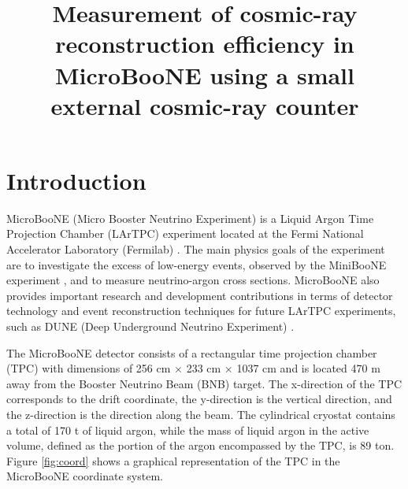 \documentclass[a4paper,11pt]{article}
\title{\boldmath Measurement of cosmic-ray reconstruction efficiency in MicroBooNE using a small external cosmic-ray counter}
\begin{document}
\maketitle
\flushbottom

\section{Introduction}
\label{sec:intro}
MicroBooNE (Micro Booster Neutrino Experiment) is a Liquid Argon Time Projection Chamber (LArTPC) experiment located at the Fermi National Accelerator Laboratory (Fermilab) \cite{detector}. The main physics goals of the experiment are to investigate the excess of low-energy events, observed by the MiniBooNE experiment \cite{miniboone}, and to measure neutrino-argon cross sections. MicroBooNE also provides important research and development contributions in terms of detector technology and event reconstruction techniques for future LArTPC experiments, such as DUNE (Deep Underground Neutrino Experiment) \cite{dune}.

The MicroBooNE detector  consists of a rectangular time projection chamber (TPC) with dimensions of 256 cm $\times$ 233 cm $\times$ 1037 cm and is located 470 m away from the Booster Neutrino Beam (BNB) target. The x-direction of the TPC corresponds to the drift coordinate, the y-direction is the vertical direction, and the z-direction is the direction along the beam. The cylindrical cryostat contains a total of 170 t of liquid argon, while the mass of liquid argon in the active volume, defined as the portion of the argon encompassed by the TPC, is 89 ton. Figure \ref{fig:coord} shows a graphical representation of the TPC in the MicroBooNE coordinate system.
\end{document}
